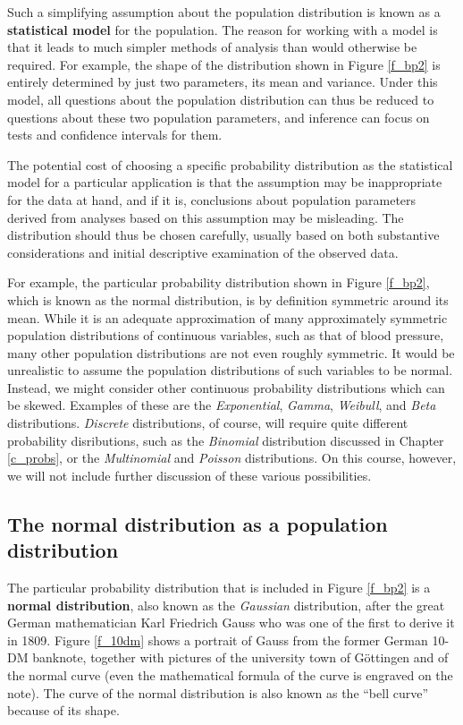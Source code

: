 \label{p-model}
Such a simplifying assumption about
the population distribution is known as a \textbf{statistical model} for
the population.
The reason for working with a model is that it leads to much
simpler methods of analysis than would otherwise be required. For
example, the shape of the distribution shown in Figure \ref{f_bp2} is
entirely determined by just two parameters, its mean and variance.
Under this model, all questions about the population distribution
can thus be reduced to questions about these two
population parameters, and inference can focus on tests and confidence
intervals for them.

The potential cost of choosing a specific probability distribution as
the statistical model for a particular application is that the
assumption may be inappropriate for the data at hand, and if it is,
conclusions about population parameters derived from analyses based on
this assumption may be misleading. The distribution should thus be
chosen carefully, usually based on both substantive considerations and
initial descriptive examination of the observed data.

For example, the particular probability distribution shown in Figure
\ref{f_bp2}, which is known as the normal distribution, is by definition
symmetric around its mean. While it is an adequate approximation of many
approximately symmetric population distributions of continuous
variables, such as that of blood pressure, many other population
distributions are not even roughly symmetric. It would be unrealistic to
assume the population distributions of such variables to be normal.
Instead, we might consider other continuous probability distributions
which can be skewed. Examples of these are the \emph{Exponential},
\emph{Gamma}, \emph{Weibull}, and \emph{Beta} distributions.
\emph{Discrete} distributions, of course, will require quite different
probability disributions, such as the \emph{Binomial} distribution
discussed in Chapter \ref{c_probs}, or the \emph{Multinomial} and
\emph{Poisson} distributions. On this course, however, we will not
include further discussion of these various possibilities.

\subsection{The normal distribution as a population distribution}
\label{ss_contd_probdistrs_normal}

The particular probability distribution that is included in Figure
\ref{f_bp2} is a \textbf{normal distribution}, also known as the
\emph{Gaussian} distribution, after the great German mathematician Karl
Friedrich Gauss who was one of the first to derive it in 1809. Figure
\ref{f_10dm} shows a portrait of Gauss from the former German 10-DM
banknote, together with pictures of the university town of G\"{o}ttingen
and of the normal curve (even the mathematical formula of the curve is
engraved on the note). The curve of the normal distribution is also
known as the ``bell curve'' because of its shape.

